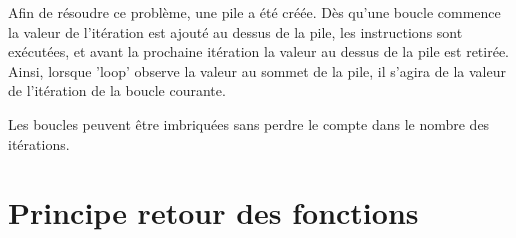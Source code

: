 \documentclass[a4paper,11pt]{article}
\begin{document}
Afin de résoudre ce problème, une pile a été créée. Dès qu'une boucle commence la valeur de l'itération est ajouté au dessus de la pile, les instructions sont exécutées, et avant la prochaine itération la valeur au dessus de la pile est retirée. Ainsi, lorsque 'loop' observe la valeur au sommet de la pile, il s'agira de la valeur de l'itération de la boucle courante.

Les boucles peuvent être imbriquées sans perdre le compte dans le nombre des itérations. 

\section{Principe retour des fonctions}



\end{document}
